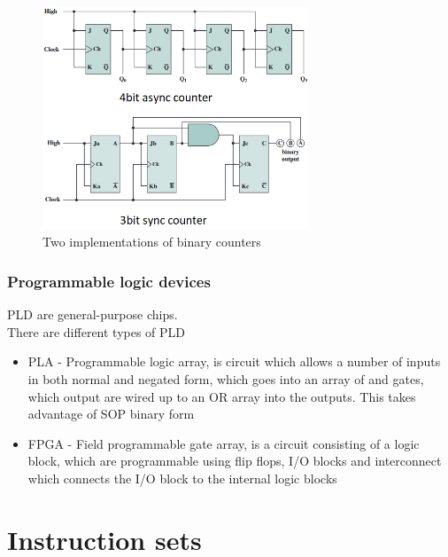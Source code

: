 \documentclass[12pt, a4paper]{article}
\begin{document}
					\begin{figure}[h!]
						\includegraphics[width=300px]{assets/counters.png}
						\centering
						\caption{Two implementations of binary counters}
					\end{figure}
				\subsubsection{Programmable logic devices}
					PLD are general-purpose chips.\\
					There are different types of PLD
					\begin{itemize}
						\item PLA - Programmable logic array, is circuit which allows a number of inputs in both normal and negated form, which goes into an array of and gates, which output are wired up to an OR array into the outputs. This takes advantage of SOP binary form
						\item FPGA - Field programmable gate array, is a circuit consisting of a logic block, which are programmable using flip flops, I/O blocks and interconnect which connects the I/O block to the internal logic blocks
					\end{itemize}
	\section{Instruction sets}
\end{document}
